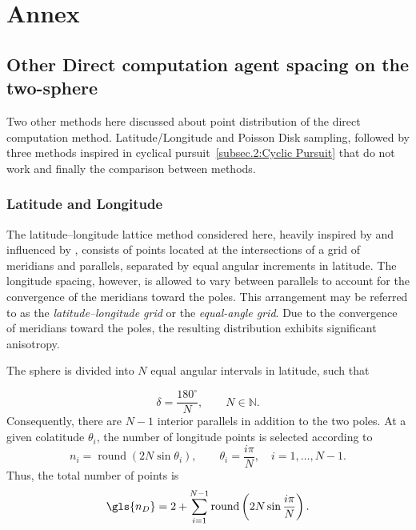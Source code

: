 

%

\chapter{Annex}
\label{cha:Appendix}


\section{Other Direct computation agent spacing on the two-sphere} \label{annex:Other Direct computation agent spacing on the two-sphere}

Two other methods here discussed about point distribution of the direct computation method. Latitude/Longitude and Poisson Disk sampling, followed by three methods inspired in cyclical pursuit~\ref{subsec.2:Cyclic Pursuit} that do not work and finally the comparison between methods.

\subsection{Latitude and Longitude} \label{sec.2:Latitude and longitude}

The latitude--longitude lattice method considered here, heavily inspired by and influenced by \cite{Latitude_Longitude_vs_fibonacci}, consists of points located at the intersections of a grid of meridians and parallels, separated by equal angular increments in latitude. The longitude spacing, however, is allowed to vary between parallels to account for the convergence of the meridians toward the poles. This arrangement may be referred to as the \emph{latitude--longitude grid} or the \emph{equal-angle grid}. Due to the convergence of meridians toward the poles, the resulting distribution exhibits significant anisotropy.

The sphere is divided into \(N\) equal angular intervals in latitude, such that

$$
\delta = \frac{180^\circ}{N},
\qquad N \in \mathbb{N}.
$$
Consequently, there are \(N-1\) interior parallels in addition to the two poles. At a given colatitude \(\theta_i\), the number of longitude points is selected according to
$$
n_i = \operatorname{round}\left(2N\sin\theta_i\right),
\qquad
\theta_i = \frac{i\pi}{N},
\quad i=1,\ldots,N-1.
$$
Thus, the total number of points is
$$
\gls{n_D} =
2+
\sum_{i=1}^{N-1}
\operatorname{round}
\left(
2N\sin\frac{i\pi}{N}
\right).
$$

